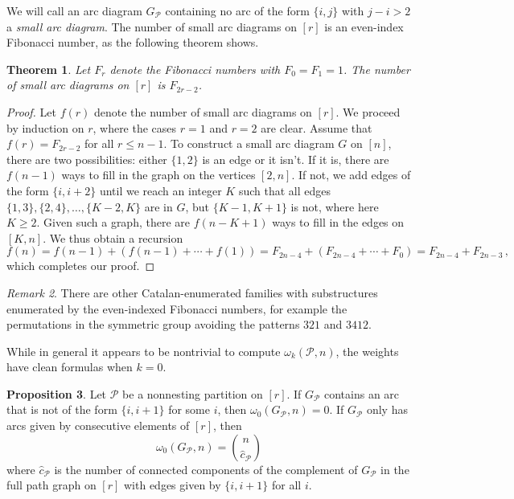 \documentclass[11pt]{amsart}
\newtheorem{theorem}{Theorem}[section]
\theoremstyle{definition}
\newtheorem{proposition}[theorem]{Proposition}
\numberwithin{equation}{section}
\theoremstyle{remark}
\newtheorem{remark}[theorem]{Remark}
\numberwithin{equation}{section}
\begin{document}
We will call an arc diagram $G_{\mathcal{P}}$ containing no arc of the form $\{i,j\}$ with $j-i>2$ a \emph{small arc diagram}.
The number of small arc diagrams on $[r]$ is an even-index Fibonacci number, as the following theorem shows.

\begin{theorem}
Let $F_{r}$ denote the Fibonacci numbers with $F_0=F_1=1$.
The number of small arc diagrams on $[r]$ is $F_{2r-2}$.
\end{theorem}

\begin{proof}
Let $f(r)$ denote the number of small arc diagrams on $[r]$.
We proceed by induction on $r$, where the cases $r=1$ and $r=2$ are clear.
Assume that $f(r)=F_{2r-2}$ for all $r\leq n-1$.
To construct a small arc diagram $G$ on $[n]$, there are two possibilities: either $\{1,2\}$ is an edge or it isn't. 
If it is, there are $f(n-1)$ ways to fill in the graph on the vertices $[2,n]$.
If not, we add edges of the form $\{i,i+2\}$ until we reach an integer $K$ such that all edges $\{1,3\}, \{2,4\},\ldots,\{K-2,K\}$ are in $G$, but $\{K-1,K+1\}$ is not, where here $K\geq 2$.
Given such a graph, there are $f(n-K+1)$ ways to fill in the edges on $[K,n]$.
We thus obtain a recursion 
\[f(n) = f(n-1) + (f(n-1)+\cdots +f(1))=F_{2n-4}+(F_{2n-4}+\cdots+F_{0})=F_{2n-4}+F_{2n-3} \, ,\] 
which completes our proof.
\end{proof}

\begin{remark}
There are other Catalan-enumerated families with substructures enumerated by the even-indexed Fibonacci numbers, for example \cite[Corollary 4.4]{TennerPattern} the permutations in the symmetric group avoiding the patterns $321$ and $3412$.
\end{remark}

While in general it appears to be nontrivial to compute $\omega_k({\mathcal{P}},n)$, the weights have clean formulas when $k=0$.

\begin{proposition}
Let ${\mathcal{P}}$ be a nonnesting partition on $[r]$.
If $G_{\mathcal{P}}$ contains an arc that is not of the form $\{i,i+1\}$ for some $i$, then $\omega_0(G_{\mathcal{P}},n)=0$.
If $G_{\mathcal{P}}$ only has arcs given by consecutive elements of $[r]$, then
\[\omega_0(G_{\mathcal{P}},n)=\binom{n}{\hat{c}_{\mathcal{P}}} \]
where $\hat{c}_{\mathcal{P}}$ is the number of connected components of the complement of $G_{\mathcal{P}}$ in the full path graph on $[r]$ with edges given by $\{i,i+1\}$ for all $i$.
\end{proposition}
\end{document}

